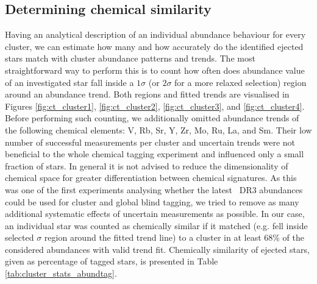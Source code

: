 \subsection{Determining chemical similarity}
\label{sec:chem_ej_tag}
Having an analytical description of an individual abundance behaviour for every cluster, we can estimate how many and how accurately do the identified ejected stars match with cluster abundance patterns and trends. The most straightforward way to perform this is to count how often does abundance value of an investigated star fall inside a $1\sigma$ (or $2\sigma$ for a more relaxed selection) region around an abundance trend. Both regions and fitted trends are visualised in Figures \ref{fig:ct_cluster1}, \ref{fig:ct_cluster2}, \ref{fig:ct_cluster3}, and \ref{fig:ct_cluster4}. Before performing such counting, we additionally omitted abundance trends of the following chemical elements: V, Rb, Sr, Y, Zr, Mo, Ru, La, and Sm. Their low number of successful measurements per cluster and uncertain trends were not beneficial to the whole chemical tagging experiment and influenced only a small fraction of stars. In general it is not advised to reduce the dimensionality of chemical space for greater differentiation between chemical signatures. As this was one of the first experiments analysing whether the latest \Gh\ DR3 abundances could be used for cluster and global blind tagging, we tried to remove as many additional systematic effects of uncertain measurements as possible. In our case, an individual star was counted as chemically similar if it matched (e.g. fell inside selected $\sigma$ region around the fitted trend line) to a cluster in at least $68$\% of the considered abundances with valid trend fit. Chemically similarity of ejected stars, given as percentage of tagged stars, is presented in Table \ref{tab:cluster_stats_abundtag}.


